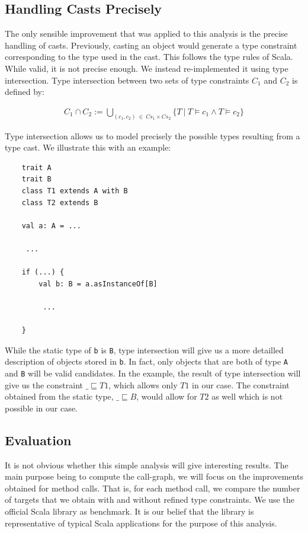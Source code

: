 \documentclass[a4paper]{article}
\newcommand{\subtypeeq}{\sqsubseteq}
\begin{document}
\subsection{Handling Casts Precisely}
The only sensible improvement that was applied to this analysis is the precise
handling of casts. Previously, casting an object would generate a type
constraint corresponding to the type used in the cast. This follows the type
rules of Scala. While valid, it is not precise enough. We instead
re-implemented it using type intersection. Type intersection between two sets
of type constraints $C_1$ and $C_2$ is defined by:

\begin{eqnarray*}
        C_1 \cap C_2 := \bigcup_{(c_1,c_2) ~ \in ~ Cs_1 \times Cs_2} \{ T ~|~ T \models c_1 \land T \models c_2  \}
\end{eqnarray*}

Type intersection allows us to model precisely the possible types resulting
from a type cast. We illustrate this with an example:


\begin{lstlisting}
    trait A
    trait B
    class T1 extends A with B
    class T2 extends B

    val a: A = ...

     ...

    if (...) {
        val b: B = a.asInstanceOf[B]

         ...

    }
\end{lstlisting}


While the static type of \verb=b= is \verb=B=, type intersection will give us a
more detailled description of objects stored in \verb=b=. In fact, only objects that
are both of type \verb=A= and \verb=B= will be valid candidates. In the example,
the result of type intersection will give us the constraint $\_ \subtypeeq T1$,
which allows only $T1$ in our case. The constraint obtained from the static
type, $\_ \subtypeeq B$, would allow for $T2$ as well which is not possible in
our case.

\subsection{Evaluation}
It is not obvious whether this simple analysis will give interesting results.
The main purpose being to compute the call-graph, we will focus on the
improvements obtained for method calls. That is, for each method call, we
compare the number of targets that we obtain with and without refined type
constraints. We use the official Scala library as benchmark. It is our belief
that the library is representative of typical Scala applications for the
purpose of this analysis.
\end{document}
